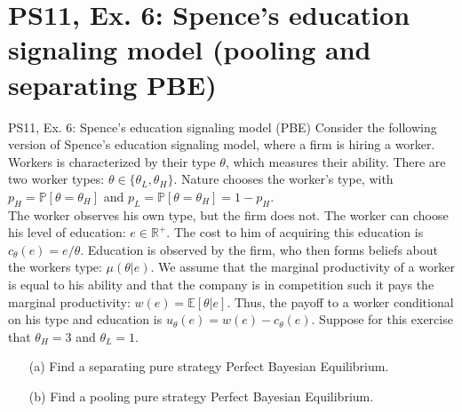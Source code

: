 \section{PS11, Ex. 6: Spence’s education signaling model (pooling and separating PBE)}

\begin{frame}{PS11, Ex. 6: Spence’s education signaling model (PBE)}
    Consider the following version of Spence’s education signaling model, where a firm is hiring a worker. Workers is characterized by their type $\theta$, which measures their ability. There are two worker types: $\theta\in\{\theta_L,\theta_H\}$. Nature chooses the worker’s type, with $p_H=\mathbb{P}[\theta=\theta_H]$ and $p_L=\mathbb{P}[\theta=\theta_H]=1-p_H$.\\\smallskip
    The worker observes his own type, but the firm does not. The worker can choose his level of education: $e\in\mathbb{R}^{+}$. The cost to him of acquiring this education is $c_\theta(e)=e/\theta$. Education is observed by the firm, who then forms beliefs about the workers type: $\mu(\theta|e)$. We assume that the marginal productivity of a worker is equal to his ability and that the company is in competition such it pays the marginal productivity: $w(e)=\mathbb{E}[\theta|e]$. Thus, the payoff to a worker conditional on his type and education is $u_\theta(e)=w(e)-c_\theta(e)$. Suppose for this exercise that $\theta_H=3$ and $\theta_L=1$.\vspace{-4pt}
    \begin{itemize}
      \item[(a)] Find a separating pure strategy Perfect Bayesian Equilibrium.
      \item[(b)] Find a pooling pure strategy Perfect Bayesian Equilibrium.
    \end{itemize}
    \vfill\null
\end{frame}

